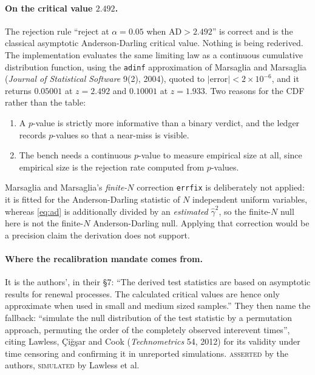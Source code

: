 \documentclass[11pt,a4paper]{article}
\newcommand{\gh}{\hat\gamma}
\newcommand{\SIMULATED}{\textsc{\textcolor{orange!70!black}{simulated}}}
\newcommand{\ASSERTED}{\textsc{\textcolor{purple!70!black}{asserted}}}
\begin{document}
\paragraph{On the critical value $2.492$.}
The rejection rule \enquote{reject at $\alpha = 0.05$ when $\mathrm{AD} > 2.492$} is
correct and is the classical asymptotic Anderson-Darling critical value. Nothing is
being rederived. The implementation evaluates the same limiting law as a continuous
cumulative distribution function, using the \texttt{adinf} approximation of Marsaglia
and Marsaglia (\emph{Journal of Statistical Software} 9(2), 2004), quoted to
$|\text{error}| < 2\times 10^{-6}$, and it returns $0.05001$ at $z = 2.492$ and
$0.10001$ at $z = 1.933$. Two reasons for the CDF rather than the table:
\begin{enumerate}[leftmargin=1.6em,itemsep=1pt]
\item A $p$-value is strictly more informative than a binary verdict, and the ledger
records $p$-values so that a near-miss is visible.
\item The bench needs a continuous $p$-value to measure empirical size at all, since
empirical size is the rejection rate computed from $p$-values.
\end{enumerate}
Marsaglia and Marsaglia's \emph{finite-$N$} correction \texttt{errfix} is deliberately
not applied: it is fitted for the Anderson-Darling statistic of $N$ independent uniform
variables, whereas \eqref{eq:ad} is additionally divided by an \emph{estimated}
$\gh^2$, so the finite-$N$ null here is not the finite-$N$ Anderson-Darling null.
Applying that correction would be a precision claim the derivation does not support.

\paragraph{Where the recalibration mandate comes from.}
It is the authors', in their \S 7:
\enquote{The derived test statistics are based on asymptotic results for renewal
processes. The calculated critical values are hence only approximate when used in small
and medium sized samples.} They then name the fallback:
\enquote{simulate the null distribution of the test statistic by a permutation approach,
permuting the order of the completely observed interevent times}, citing Lawless,
Çiğşar and Cook (\emph{Technometrics} 54, 2012) for its validity under time censoring
and confirming it in unreported simulations. \ASSERTED{} by the authors,
\SIMULATED{} by Lawless et al.
\end{document}
